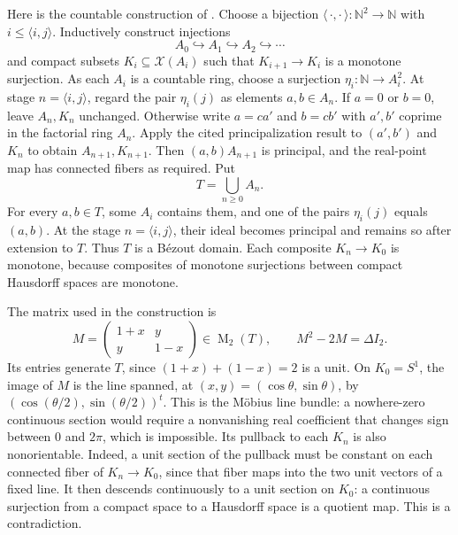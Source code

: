 \documentclass[11pt]{amsart}
\theoremstyle{definition}
\theoremstyle{remark}
\newcommand{\Mat}{\operatorname{M}}
\begin{document}
Here is the countable construction of \cite[Construction~5.1]{HaggMortberg2026}.
Choose a bijection $\langle\,\cdot,\cdot\,\rangle:\mathbb N^2\to\mathbb N$
with $i\le\langle i,j\rangle$. Inductively construct injections
\[
 A_0\hookrightarrow A_1\hookrightarrow A_2\hookrightarrow\cdots
\]
and compact subsets $K_i\subseteq\mathcal X(A_i)$ such that
$K_{i+1}\to K_i$ is a monotone surjection. As each $A_i$ is a
countable ring, choose a surjection $\eta_i:\mathbb N\to A_i^2$.
At stage $n=\langle i,j\rangle$, regard the pair $\eta_i(j)$ as
elements $a,b\in A_n$. If $a=0$ or $b=0$, leave $A_n,K_n$ unchanged.
Otherwise write $a=ca'$ and $b=cb'$ with $a',b'$ coprime in the
factorial ring $A_n$. Apply the cited principalization result to
$(a',b')$ and $K_n$ to obtain $A_{n+1},K_{n+1}$. Then
$(a,b)A_{n+1}$ is principal, and the real-point map has connected
fibers as required. Put
\[
 T=\bigcup_{n\ge0}A_n.
\]
For every $a,b\in T$, some $A_i$ contains them, and one of the
pairs $\eta_i(j)$ equals $(a,b)$. At the stage
$n=\langle i,j\rangle$, their ideal becomes principal and remains so
after extension to $T$. Thus $T$ is a B\'ezout domain. Each composite
$K_n\to K_0$ is monotone, because composites of monotone surjections
between compact Hausdorff spaces are monotone.

The matrix used in the construction is
\[
 M=\begin{pmatrix}1+x&y\\y&1-x\end{pmatrix}\in\Mat_2(T),
 \qquad M^2-2M=\Delta I_2.
\]
Its entries generate $T$, since $(1+x)+(1-x)=2$ is a unit.
On $K_0=S^1$, the image of $M$ is the line spanned, at
$(x,y)=(\cos\theta,\sin\theta)$, by
$(\cos(\theta/2),\sin(\theta/2))^t$. This is the M\"obius line
bundle: a nowhere-zero continuous section would require a
nonvanishing real coefficient that changes sign between $0$ and
$2\pi$, which is impossible. Its pullback to each $K_n$ is also
nonorientable. Indeed, a unit section of the pullback must be constant
on each connected fiber of $K_n\to K_0$, since that fiber maps into
the two unit vectors of a fixed line. It then descends continuously
to a unit section on $K_0$: a continuous surjection from a compact
space to a Hausdorff space is a quotient map. This is a contradiction.
\end{document}
